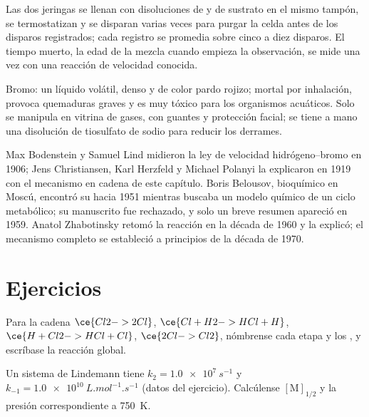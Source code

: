 \begin{inthelab}
Las dos jeringas se llenan con disoluciones de  y de sustrato en el mismo
tampón, se termostatizan y se disparan varias veces para purgar la celda antes de los
disparos registrados; cada registro se promedia sobre cinco a diez disparos. El tiempo muerto,
la edad de la mezcla cuando empieza la observación, se mide una vez con una
reacción de velocidad conocida.
\end{inthelab}

\begin{safety}{}
Bromo: un líquido volátil, denso y de color pardo rojizo; mortal por inhalación, provoca quemaduras
graves y es muy tóxico para los organismos acuáticos. Solo se manipula en vitrina de gases, con guantes
y protección facial; se tiene a mano una disolución de tiosulfato de sodio para reducir los
derrames.
\end{safety}

\begin{history}
Max Bodenstein y Samuel Lind midieron la ley de velocidad hidrógeno--bromo en
1906; Jens Christiansen, Karl Herzfeld y Michael Polanyi la explicaron en
1919 con el mecanismo en cadena de este capítulo. Boris Belousov, bioquímico en
Moscú, encontró su  hacia 1951 mientras buscaba un
modelo químico de un ciclo metabólico; su manuscrito fue rechazado, y solo un
breve resumen apareció en 1959. Anatol Zhabotinsky retomó la reacción en
la década de 1960 y la explicó; el mecanismo completo se estableció a principios de la
década de 1970.
\end{history}

\section{Ejercicios}

\begin{exercise}[$\star$]\label{exo:b3:complex-kinetics:1}
Para la cadena $\ce{Cl2 -> 2 Cl}$, $\ce{Cl + H2 -> HCl + H}$, $\ce{H + Cl2 -> HCl + Cl}$, $\ce{2 Cl -> Cl2}$,
nómbrense cada etapa y los , y escríbase la reacción global.
\end{exercise}

\begin{exercise}[$\star$]\label{exo:b3:complex-kinetics:2}
Un sistema de Lindemann tiene $k_2 = \qty{1.0e7}{s^{-1}}$ y $k_{-1} = \qty{1.0e10}{L.mol^{-1}.s^{-1}}$ (datos del
ejercicio). Calcúlense $[\mathrm M]_{1/2}$ y la presión correspondiente a \qty{750}{K}.
\end{exercise}

